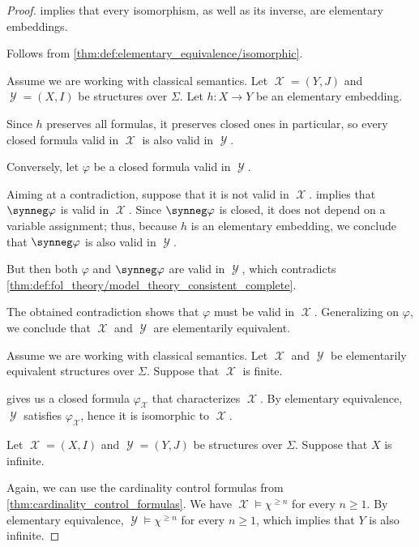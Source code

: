 \begin{proof}
    implies that every isomorphism, as well as its inverse, are elementary embeddings.

   Follows from \cref{thm:def:elementary_equivalence/isomorphic}.

   Assume we are working with classical semantics. Let \( \mscrX = (Y, J) \) and \( \mscrY = (X, I) \) be structures over \( \Sigma \). Let \( h: X \to Y \) be an elementary embedding.

  Since \( h \) preserves all formulas, it preserves closed ones in particular, so every closed formula valid in \( \mscrX \) is also valid in \( \mscrY \).

  Conversely, let \( \varphi \) be a closed formula valid in \( \mscrY \).

  Aiming at a contradiction, suppose that it is not valid in \( \mscrX \).  implies that \( \synneg \varphi \) is valid in \( \mscrX \). Since \( \synneg \varphi \) is closed, it does not depend on a variable assignment; thus, because \( h \) is an elementary embedding, we conclude that \( \synneg \varphi \) is also valid in \( \mscrY \).

  But then both \( \varphi \) and \( \synneg \varphi \) are valid in \( \mscrY \), which contradicts \cref{thm:def:fol_theory/model_theory_consistent_complete}.

  The obtained contradiction shows that \( \varphi \) must be valid in \( \mscrX \). Generalizing on \( \varphi \), we conclude that \( \mscrX \) and \( \mscrY \) are elementarily equivalent.

   Assume we are working with classical semantics. Let \( \mscrX \) and \( \mscrY \) be elementarily equivalent structures over \( \Sigma \). Suppose that \( \mscrX \) is finite.

   gives us a closed formula \( \varphi_\mscrX \) that characterizes \( \mscrX \). By elementary equivalence, \( \mscrY \) satisfies \( \varphi_\mscrX \), hence it is isomorphic to \( \mscrX \).

   Let \( \mscrX = (X, I) \) and \( \mscrY = (Y, J) \) be structures over \( \Sigma \). Suppose that \( X \) is infinite.

  Again, we can use the cardinality control formulas from \cref{thm:cardinality_control_formulas}. We have \( \mscrX \vDash \chi^{\geq n} \) for every \( n \geq 1 \). By elementary equivalence, \( \mscrY \vDash \chi^{\geq n} \) for every \( n \geq 1 \), which implies that \( Y \) is also infinite.
\end{proof}

